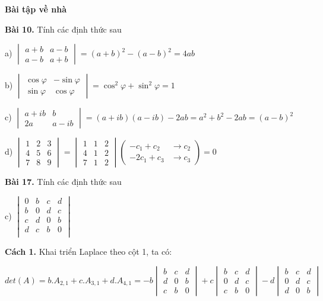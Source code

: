 \documentclass[12pt]{report}
\begin{document}
	
{\huge \textbf{Bài tập về nhà}}

\textbf{Bài 10.} Tính các định thức sau

a) $\begin{vmatrix}
a+b & a-b \\
a-b & a+b
\end{vmatrix} = (a+b)^2 - (a-b)^2 = 4ab$

b) $\begin{vmatrix}
\cos \varphi & -\sin \varphi \\
\sin \varphi & \cos \varphi
\end{vmatrix} = \cos ^ 2 \varphi + \sin ^ 2 \varphi = 1$

c) $\begin{vmatrix}
a+ ib & b \\
2a & a-ib
\end{vmatrix} = (a+ib)(a-ib) - 2ab = a^2 + b^2 - 2ab = (a-b)^2$ 

d) $\begin{vmatrix}
1 & 2 & 3 \\
4 & 5 & 6 \\
7 & 8 & 9
\end{vmatrix} = \begin{vmatrix}
1 & 1 & 2 \\
4 & 1 & 2 \\
7 & 1 & 2
\end{vmatrix} \left( \begin{smallmatrix}
-c_1 + c_2 &\to c_2 \\
-2c_1 + c_3 &\to c_3
\end{smallmatrix}\right) = 0$

\textbf{Bài 17.} Tính các định thức sau

c) $\begin{vmatrix}
0 & b & c & d \\
b & 0 & d & c \\
c & d & 0 & b \\
d & c & b & 0 \\
\end{vmatrix}$

\textbf{Cách 1.} Khai triển Laplace theo cột 1, ta có:

$det(A) = b.A_{2,1} + c.A_{3,1} + d.A_{4,1} = -b\begin{vmatrix}
b & c & d \\
d & 0 & b \\
c & b & 0
\end{vmatrix} + c\begin{vmatrix}
b & c & d \\
0 & d & c \\
c & b & 0
\end{vmatrix} - d\begin{vmatrix}
b & c & d \\
0 & d & c \\
d & 0 & b
\end{vmatrix}$
\end{document}
